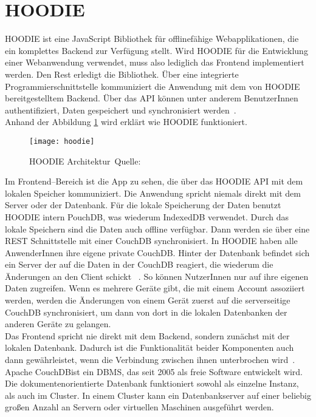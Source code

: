 \section{HOODIE}
HOODIE ist eine JavaScript Bibliothek für offlinefähige Webapplikationen, die ein komplettes Backend zur Verfügung stellt.
Wird HOODIE für die Entwicklung einer Webanwendung verwendet, muss also lediglich das Frontend implementiert werden.
Den Rest erledigt die Bibliothek. Über eine integrierte Programmierschnittstelle kommuniziert die Anwendung mit dem von HOODIE bereitgestelltem Backend.
Über das \gls{API} können unter anderem BenutzerInnen authentifiziert, Daten gespeichert und synchronisiert werden~\cite{hoodie}.\\
Anhand der Abbildung \ref{fig:hoodie} wird erklärt wie HOODIE funktioniert.
%
\begin{figure}[H]
  \centering
  \texttt{[image: hoodie]}
  \grayRule
  \caption[HOODIE Architektur]{HOODIE Architektur~Quelle:~\cite{hoodie-how}}
  \label{fig:hoodie}
\end{figure}
%
Im Frontend--Bereich ist die App zu sehen, die über das HOODIE \gls{API} mit dem lokalen Speicher kommuniziert.
Die Anwendung spricht niemals direkt mit dem Server oder der Datenbank.
Für die lokale Speicherung der Daten benutzt HOODIE intern PouchDB, was wiederum IndexedDB verwendet.
Durch das lokale Speichern sind die Daten auch offline verfügbar. Dann werden sie über eine \gls{REST} Schnittstelle mit einer CouchDB synchronisiert.
In HOODIE haben alle AnwenderInnen ihre eigene private CouchDB.
Hinter der Datenbank befindet sich ein Server der auf die Daten in der CouchDB reagiert, die wiederum die Änderungen an den Client schickt ~\cite{hoodie-how}.
So können NutzerInnen nur auf ihre eigenen Daten zugreifen. Wenn es mehrere Geräte gibt, die mit einem Account assoziiert werden, werden die Änderungen von einem Gerät zuerst auf die serverseitige CouchDB synchronisiert, um dann von dort in die lokalen Datenbanken der anderen Geräte zu gelangen.\\
Das Frontend spricht nie direkt mit dem Backend, sondern zunächst mit der lokalen Datenbank.
Dadurch ist die Funktionalität beider Komponenten auch dann gewährleistet, wenn die Verbindung zwischen ihnen unterbrochen wird~\cite{hoodie-how}.
% 
% 
Apache CouchDB\tm ist ein \gls{DBMS}, das seit 2005 als freie Software entwickelt wird.
Die dokumentenorientierte Datenbank funktioniert sowohl als einzelne Instanz, als auch im Cluster.
In einem Cluster kann ein Datenbankserver auf einer beliebig großen Anzahl an Servern oder virtuellen Maschinen ausgeführt werden.\\

